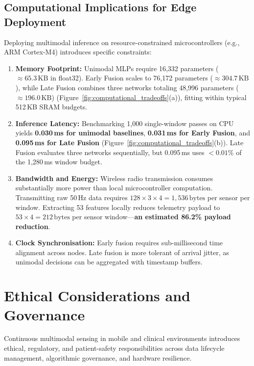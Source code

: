 \documentclass[10pt,twocolumn]{article}
\begin{document}
\subsection{Computational Implications for Edge Deployment}
Deploying multimodal inference on resource-constrained microcontrollers (e.g., ARM Cortex-M4) introduces specific constraints:
\begin{enumerate}
    \item \textbf{Memory Footprint:} Unimodal MLPs require 16,332 parameters ($\approx 65.3\,\text{KB}$ in float32). Early Fusion scales to 76,172 parameters ($\approx 304.7\,\text{KB}$), while Late Fusion combines three networks totaling 48,996 parameters ($\approx 196.0\,\text{KB}$) (Figure~\ref{fig:computational_tradeoffs}(a)), fitting within typical 512\,KB SRAM budgets.
    \item \textbf{Inference Latency:} Benchmarking 1,000 single-window passes on CPU yields \textbf{0.030\,ms for unimodal baselines}, \textbf{0.031\,ms for Early Fusion}, and \textbf{0.095\,ms for Late Fusion} (Figure~\ref{fig:computational_tradeoffs}(b)). Late Fusion evaluates three networks sequentially, but 0.095\,ms uses $<0.01\%$ of the 1,280\,ms window budget.
    \item \textbf{Bandwidth and Energy:} Wireless radio transmission consumes substantially more power than local microcontroller computation. Transmitting raw 50\,Hz data requires $128 \times 3 \times 4 = 1,536\,\text{bytes}$ per sensor per window. Extracting 53 features locally reduces telemetry payload to $53 \times 4 = 212\,\text{bytes}$ per sensor window---\textbf{an estimated 86.2\% payload reduction}.
    \item \textbf{Clock Synchronisation:} Early fusion requires sub-millisecond time alignment across nodes. Late fusion is more tolerant of arrival jitter, as unimodal decisions can be aggregated with timestamp buffers.
\end{enumerate}

\section{Ethical Considerations and Governance}
\label{sec:ethics}

Continuous multimodal sensing in mobile and clinical environments introduces ethical, regulatory, and patient-safety responsibilities across data lifecycle management, algorithmic governance, and hardware resilience.
\end{document}
